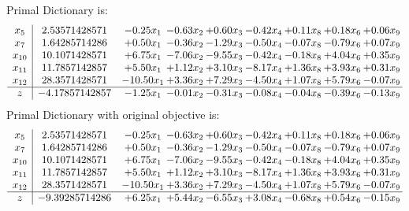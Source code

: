 \documentclass[8pt]{article}
\begin{document}
Primal Dictionary is:
\[\begin{array}{c| c c@{\hskip 2pt} c@{\hskip 2pt} c@{\hskip 2pt} c@{\hskip 2pt} c@{\hskip 2pt} c@{\hskip 2pt} c@{\hskip 2pt} }
 x_{5}   &  2.53571428571 & -0.25 x_{1} & -0.63 x_{2} & +  0.60 x_{3} & -0.42 x_{4} & +  0.11 x_{8} & +  0.18 x_{6} & +  0.06 x_{9}\\
 x_{7}   &  1.64285714286 & +  0.50 x_{1} & -0.36 x_{2} & -1.29 x_{3} & -0.50 x_{4} & -0.07 x_{8} & -0.79 x_{6} & +  0.07 x_{9}\\
 x_{10}   &  10.1071428571 & +  6.75 x_{1} & -7.06 x_{2} & -9.55 x_{3} & -0.42 x_{4} & -0.18 x_{8} & +  4.04 x_{6} & +  0.35 x_{9}\\
 x_{11}   &  11.7857142857 & +  5.50 x_{1} & +  1.12 x_{2} & +  3.10 x_{3} & -8.17 x_{4} & +  1.36 x_{8} & +  3.93 x_{6} & +  0.31 x_{9}\\
 x_{12}   &  28.3571428571 & -10.50 x_{1} & +  3.36 x_{2} & +  7.29 x_{3} & -4.50 x_{4} & +  1.07 x_{8} & +  5.79 x_{6} & -0.07 x_{9}\\
\hline
z    &  -4.17857142857 & -1.25 x_{1} & -0.01 x_{2} & -0.31 x_{3} & -0.08 x_{4} & -0.04 x_{8} & -0.39 x_{6} & -0.13 x_{9}\\
\end{array}\]
Primal Dictionary with original objective is:
\[\begin{array}{c| c c@{\hskip 2pt} c@{\hskip 2pt} c@{\hskip 2pt} c@{\hskip 2pt} c@{\hskip 2pt} c@{\hskip 2pt} c@{\hskip 2pt} }
 x_{5}   &  2.53571428571 & -0.25 x_{1} & -0.63 x_{2} & +  0.60 x_{3} & -0.42 x_{4} & +  0.11 x_{8} & +  0.18 x_{6} & +  0.06 x_{9}\\
 x_{7}   &  1.64285714286 & +  0.50 x_{1} & -0.36 x_{2} & -1.29 x_{3} & -0.50 x_{4} & -0.07 x_{8} & -0.79 x_{6} & +  0.07 x_{9}\\
 x_{10}   &  10.1071428571 & +  6.75 x_{1} & -7.06 x_{2} & -9.55 x_{3} & -0.42 x_{4} & -0.18 x_{8} & +  4.04 x_{6} & +  0.35 x_{9}\\
 x_{11}   &  11.7857142857 & +  5.50 x_{1} & +  1.12 x_{2} & +  3.10 x_{3} & -8.17 x_{4} & +  1.36 x_{8} & +  3.93 x_{6} & +  0.31 x_{9}\\
 x_{12}   &  28.3571428571 & -10.50 x_{1} & +  3.36 x_{2} & +  7.29 x_{3} & -4.50 x_{4} & +  1.07 x_{8} & +  5.79 x_{6} & -0.07 x_{9}\\
\hline
z    &  -9.39285714286 & +  6.25 x_{1} & +  5.44 x_{2} & -6.55 x_{3} & +  3.08 x_{4} & -0.68 x_{8} & +  0.54 x_{6} & -0.15 x_{9}\\
\end{array}\]
\end{document}
